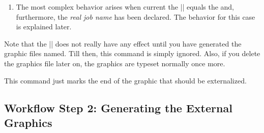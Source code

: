 \begin{command}{\beginpgfgraphicnamed{}}
\begin{enumerate}
            When the text is ``ignored'', what actually happens is that all
            text up to the next occurrence of |\endpgfgraphicnamed| is thrown
            away without any macro expansion. This means, in particular, that
            (a) you cannot put |\endpgfgraphicnamed| inside a macro and (b) the
            macros used in the graphics need not be defined at all when the
            graphic file is included. \item The most complex behavior arises
            when current the |\jobname| equals the  and,
            furthermore, the \emph{real job name} has been declared. The
            behavior for this case is explained later.
    \end{enumerate}

    Note that the |\beginpgfgraphicnamed| does not really have any effect until
    you have generated the graphic files named. Till then, this command is
    simply ignored. Also, if you delete the graphics file later on, the
    graphics are typeset normally once more.
\end{command}

\begin{command}{\endpgfgraphicnamed}
    This command just marks the end of the graphic that should be externalized.
\end{command}


\subsection{Workflow Step 2: Generating the External Graphics}

